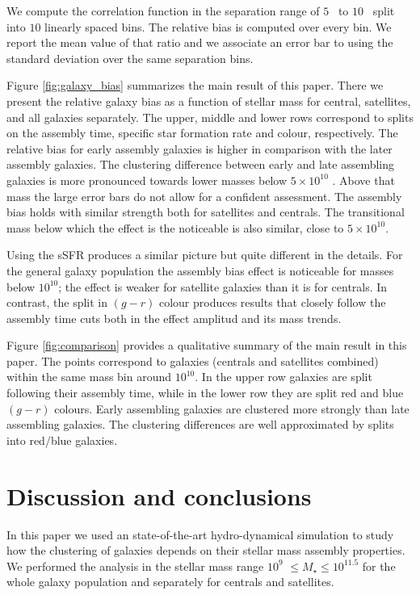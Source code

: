 \documentclass{aa}
\begin{document}
We compute the correlation function in the separation range of
$5$ \Mpch\ to $10$ \Mpch\ split into $10$ linearly spaced bins. 
The relative bias is computed over every bin.
We report the mean value of that ratio and we associate an error bar
to using the standard deviation over the same separation bins.

Figure \ref{fig:galaxy_bias} summarizes the main result of this paper.
There we present the relative galaxy bias as a
function of stellar mass for central, satellites, and all galaxies
separately. 
The upper, middle and lower rows correspond to splits on the assembly
time, specific star formation rate and colour, respectively.
The relative bias for early assembly galaxies is higher in comparison
with the later assembly galaxies.
The clustering difference between early and late assembling galaxies
is more pronounced towards lower masses below $5 \times 10^{10}$
\Msunh.
Above that mass the large error bars do not allow for a confident
assessment. 
The assembly bias holds with similar strength both for satellites and
centrals. 
The transitional mass below which the effect is the noticeable is also
similar, close to $5\times 10^{10}$\Msunh.

Using the sSFR produces a similar picture but quite different in the
details. 
For the general galaxy population the assembly bias effect is
noticeable for masses below $10^{10}$\Msunh; the effect is weaker for
satellite galaxies than it is for centrals. 
In contrast, the split in $(g-r)$ colour produces results that
closely follow the assembly time cuts both in the effect amplitud and
its mass trends.

Figure \ref{fig:comparison} provides a qualitative summary of the main
result in this paper.
The points correspond to galaxies (centrals and satellites combined) 
within the same mass bin around $10^{10}$\Msunh. 
In the upper row galaxies are split following their assembly time,
while in the lower row they are split red and blue $(g-r)$ colours.
Early assembling galaxies are clustered more strongly than late
assembling galaxies. 
The clustering differences are well approximated by splits into
red/blue galaxies. 



\section{Discussion and conclusions}
\label{sec:conclu}

In this paper we used an state-of-the-art hydro-dynamical simulation
to study how the clustering of galaxies depends on their stellar mass assembly
properties.
We performed the analysis in the stellar mass range $10^{9}$\Msunh
$\leq M_{\star} \leq 10^{11.5}$ for the whole galaxy population and
separately for centrals and satellites. 
\end{document}
